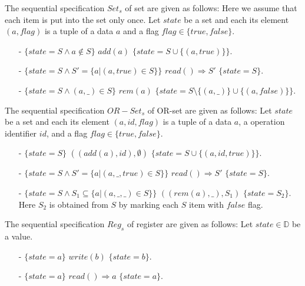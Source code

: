 \begin{example}[Set]
\label{definition:sequential specification of set}
The sequential specification $\mathit{Set}_s$ of set are given as follows: Here we assume that each item is put into the set only once. Let $state$ be a set and each its element $(a,flag)$ is a tuple of a data $a$ and a flag $flag \in \{ \mathit{true},\mathit{false} \}$.

\begin{itemize}
\setlength{\itemsep}{0.5pt}
\item[-] $\{ state = S \wedge a \notin S \}$ $add(a)$ $\{ state = S \cup \{ (a,\mathit{true}) \} \}$.
\item[-] $\{ state = S \wedge S' = \{a \vert (a,\mathit{true}) \in S \} \}$ $read() \Rightarrow S'$ $\{ state = S \}$.
\item[-] $\{ state = S \wedge (a,\_) \in S \}$ $rem(a)$ $\{ state = S \setminus \{ (a,\_) \} \cup \{ (a,\mathit{false}) \} \}$.
\end{itemize}
\end{example}



\begin{example}[OR-Set]
\label{definition:sequential specification of or-set}
The sequential specification $\mathit{OR-Set}_s$ of OR-set are given as follows: Let $state$ be a set and each its element $(a,id,flag)$ is a tuple of a data $a$, a operation identifier $id$, and a flag $flag \in \{ \mathit{true},\mathit{false} \}$.
\begin{itemize}
\setlength{\itemsep}{0.5pt}
\item[-] $\{ state = S  \}$ $((add(a),\mathit{id}),\emptyset)$ $\{ state = S \cup \{ (a,\mathit{id},\mathit{true}) \} \}$.
\item[-] $\{ state = S \wedge S' = \{ a \vert (a,\_,\mathit{true}) \in S \} \}$ $read() \Rightarrow S'$ $\{ state = S \}$.
\item[-] $\{ state = S  \wedge S_1 \subseteq \{a \vert (a,\_,\_) \in S\} \}$ $((rem(a),\_),S_1)$ $\{ state = S_2  \}$. Here $S_2$ is obtained from $S$ by marking each $S$ item with $\mathit{false}$ flag.
\end{itemize}
\end{example}


\begin{example}[Register]
\label{definition:sequential specification of register}
The sequential specification $\mathit{Reg}_s$ of register are given as follows: Let $state \in \mathbb{D}$ be a value.
\begin{itemize}
\setlength{\itemsep}{0.5pt}
\item[-] $\{ state = a  \}$ $write(b)$ $\{ state = b \}$.
\item[-] $\{ state = a \}$ $read() \Rightarrow a$ $\{ state = a \}$.
\end{itemize}
\end{example}


